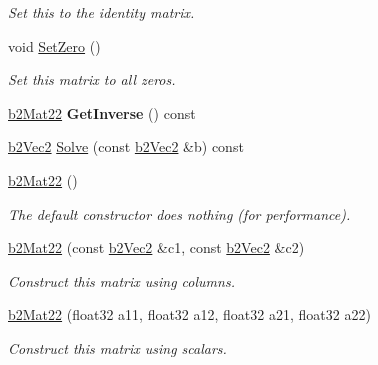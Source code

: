 \begin{DoxyCompactItemize}
\begin{DoxyCompactList}\small\item\em Set this to the identity matrix. \end{DoxyCompactList}\item 
\mbox{\label{structb2Mat22_aaeae95f61cf3171ffb94703980e3594b}} 
void \hyperlink{structb2Mat22_aaeae95f61cf3171ffb94703980e3594b}{Set\+Zero} ()
\begin{DoxyCompactList}\small\item\em Set this matrix to all zeros. \end{DoxyCompactList}\item 
\mbox{\label{structb2Mat22_ad0b0676deea081b761c67be48e0ac850}} 
\hyperlink{structb2Mat22}{b2\+Mat22} {\bfseries Get\+Inverse} () const
\item 
\hyperlink{structb2Vec2}{b2\+Vec2} \hyperlink{structb2Mat22_a3313c8d135c01fbf74e7fea31f1ea4c1}{Solve} (const \hyperlink{structb2Vec2}{b2\+Vec2} \&b) const
\item 
\mbox{\label{structb2Mat22_ac3e10f6d457c8dab9062ba378f66bc4d}} 
\hyperlink{structb2Mat22_ac3e10f6d457c8dab9062ba378f66bc4d}{b2\+Mat22} ()
\begin{DoxyCompactList}\small\item\em The default constructor does nothing (for performance). \end{DoxyCompactList}\item 
\mbox{\label{structb2Mat22_abd674c6d92e26962977f34bcd92ff24d}} 
\hyperlink{structb2Mat22_abd674c6d92e26962977f34bcd92ff24d}{b2\+Mat22} (const \hyperlink{structb2Vec2}{b2\+Vec2} \&c1, const \hyperlink{structb2Vec2}{b2\+Vec2} \&c2)
\begin{DoxyCompactList}\small\item\em Construct this matrix using columns. \end{DoxyCompactList}\item 
\mbox{\label{structb2Mat22_a41d5d8743bda32cb8c6e212528934810}} 
\hyperlink{structb2Mat22_a41d5d8743bda32cb8c6e212528934810}{b2\+Mat22} (float32 a11, float32 a12, float32 a21, float32 a22)
\begin{DoxyCompactList}\small\item\em Construct this matrix using scalars. \end{DoxyCompactList}\item 

\end{DoxyCompactItemize}
